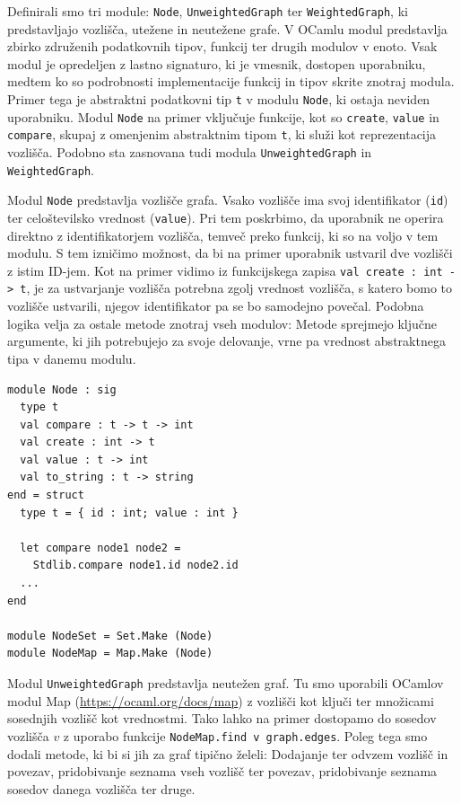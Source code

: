 \documentclass[fin1, tisk]{fmfdelo}
\begin{document}
Definirali smo tri module: \texttt{Node}, \texttt{UnweightedGraph} ter \texttt{WeightedGraph}, ki predstavljajo
vozlišča, utežene in neutežene grafe. V OCamlu modul predstavlja zbirko združenih podatkovnih tipov, funkcij ter drugih modulov v enoto.
Vsak modul je opredeljen z lastno signaturo, ki je vmesnik, dostopen uporabniku, medtem ko so podrobnosti
implementacije funkcij in tipov skrite znotraj modula. 
Primer tega je abstraktni podatkovni tip \texttt{t} v modulu \texttt{Node}, ki ostaja neviden uporabniku.
Modul \texttt{Node} na primer vključuje funkcije, kot so \texttt{create}, \texttt{value} in \texttt{compare},
skupaj z omenjenim abstraktnim tipom \texttt{t}, ki služi kot reprezentacija vozlišča.
Podobno sta zasnovana tudi modula \texttt{UnweightedGraph} in \texttt{WeightedGraph}.

Modul \texttt{Node} predstavlja vozlišče grafa. 
Vsako vozlišče ima svoj identifikator (\texttt{id}) ter celoštevilsko vrednost (\texttt{value}). Pri tem poskrbimo, da uporabnik ne 
operira direktno z identifikatorjem vozlišča, temveč preko funkcij, ki so na voljo v tem modulu.
S tem izničimo možnost, da bi na primer uporabnik ustvaril dve vozlišči z istim ID-jem. 
Kot na primer vidimo iz funkcijskega zapisa \texttt{val create : int -> t}, je za ustvarjanje vozlišča potrebna
zgolj vrednost vozlišča, s katero bomo to vozlišče ustvarili, njegov identifikator pa se bo samodejno povečal.
Podobna logika velja za ostale metode znotraj vseh modulov: Metode sprejmejo ključne argumente, ki jih potrebujejo
za svoje delovanje, vrne pa vrednost abstraktnega tipa v danemu modulu.

\begin{lstlisting}
module Node : sig
  type t
  val compare : t -> t -> int
  val create : int -> t
  val value : t -> int
  val to_string : t -> string
end = struct
  type t = { id : int; value : int }

  let compare node1 node2 = 
    Stdlib.compare node1.id node2.id
  ...
end

module NodeSet = Set.Make (Node)
module NodeMap = Map.Make (Node)

\end{lstlisting}

Modul \texttt{UnweightedGraph} predstavlja neutežen graf.
Tu smo uporabili OCamlov modul Map (\url{https://ocaml.org/docs/map}) z vozlišči kot ključi ter množicami sosednjih vozlišč
kot vrednostmi. Tako lahko na primer dostopamo do sosedov vozlišča $v$ z uporabo funkcije \texttt{NodeMap.find v graph.edges}.
Poleg tega smo dodali metode, ki bi si jih za graf tipično želeli: Dodajanje ter odvzem
vozlišč in povezav, pridobivanje seznama vseh vozlišč ter povezav, pridobivanje seznama sosedov danega vozlišča
ter druge.
\end{document}
